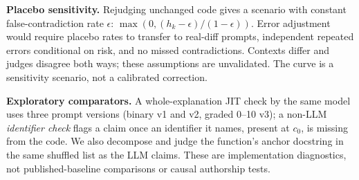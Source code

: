 \textbf{Placebo sensitivity.} Rejudging unchanged code gives a scenario with constant false-contradiction rate $\epsilon$: $\max(0,(h_k-\epsilon)/(1-\epsilon))$. Error adjustment would require placebo rates to transfer to real-diff prompts, independent repeated errors conditional on risk, and no missed contradictions. Contexts differ and judges disagree both ways; these assumptions are unvalidated. The curve is a sensitivity scenario, not a calibrated correction.

\textbf{Exploratory comparators.} A whole-explanation JIT check by the same model uses three prompt versions (binary v1 and v2, graded 0--10 v3); a non-LLM \emph{identifier check} flags a claim once an identifier it names, present at $c_0$, is missing from the code. We also decompose and judge the function's anchor docstring in the same shuffled list as the LLM claims. These are implementation diagnostics, not published-baseline comparisons or causal authorship tests.

